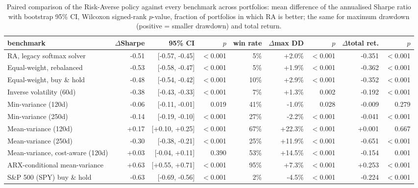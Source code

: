 \begin{table}[ht!]
\centering
\footnotesize
\setlength{\tabcolsep}{4pt}
\begin{tabular}{lrrrrrrrr}
\hline
benchmark & $\Delta$Sharpe & 95\% CI & $p$ & win rate & $\Delta$max DD & $p$ & $\Delta$total ret. & $p$ \\
\hline
RA, legacy softmax solver & -0.51 & [-0.57, -0.45] & $<$0.001 & 5\% & +2.0\% & $<$0.001 & -0.351 & $<$0.001 \\
Equal-weight, rebalanced & -0.53 & [-0.58, -0.47] & $<$0.001 & 5\% & +1.9\% & $<$0.001 & -0.362 & $<$0.001 \\
Equal-weight, buy \& hold & -0.48 & [-0.54, -0.42] & $<$0.001 & 10\% & +2.9\% & $<$0.001 & -0.352 & $<$0.001 \\
Inverse volatility (60d) & -0.38 & [-0.43, -0.33] & $<$0.001 & 7\% & +1.3\% & 0.002 & -0.192 & $<$0.001 \\
Min-variance (120d) & -0.06 & [-0.11, -0.01] & 0.019 & 41\% & -1.0\% & 0.028 & -0.009 & 0.279 \\
Min-variance (250d) & -0.14 & [-0.19, -0.10] & $<$0.001 & 27\% & -2.2\% & $<$0.001 & -0.041 & $<$0.001 \\
Mean-variance (120d) & +0.17 & [+0.10, +0.25] & $<$0.001 & 67\% & +22.3\% & $<$0.001 & +0.001 & 0.667 \\
Mean-variance (250d) & -0.30 & [-0.38, -0.21] & $<$0.001 & 25\% & +11.9\% & $<$0.001 & -0.651 & $<$0.001 \\
Mean-variance, cost-aware (120d) & +0.03 & [-0.04, +0.11] & 0.390 & 53\% & +14.5\% & $<$0.001 & -0.154 & 0.001 \\
ARX-conditional mean-variance & +0.63 & [+0.55, +0.71] & $<$0.001 & 95\% & +7.3\% & $<$0.001 & +0.253 & $<$0.001 \\
S\&P 500 (SPY) buy \& hold & -0.63 & [-0.69, -0.56] & $<$0.001 & 2\% & -4.5\% & $<$0.001 & -0.224 & $<$0.001 \\
\hline
\end{tabular}
\caption{Paired comparison of the Risk-Averse policy against every benchmark across portfolios: mean difference of the annualised Sharpe ratio with bootstrap 95\% CI, Wilcoxon signed-rank $p$-value, fraction of portfolios in which RA is better; the same for maximum drawdown (positive = smaller drawdown) and total return.}
\label{tab:bench_paired_oos2026}
\end{table}
